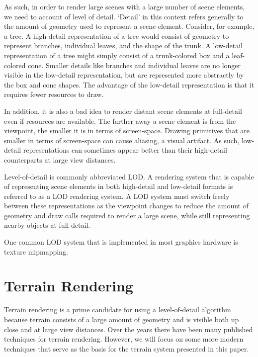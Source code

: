 As such, in order to render large scenes with a large number of scene elements, we need to account of level of detail.
`Detail' in this context refers generally to the amount of geometry used to represent a scene element.
Consider, for example, a tree.
A high-detail representation of a tree would consist of geometry to represent branches, individual leaves, and the shape of the trunk.
A low-detail representation of a tree might simply consist of a trunk-colored box and a leaf-colored cone.
Smaller details like branches and individual leaves are no longer visible in the low-detail representation, but are represented more abstractly by the box and cone shapes.
The advantage of the low-detail representation is that it requires fewer resources to draw.

In addition, it is also a bad idea to render distant scene elements at full-detail even if resources are available.
The farther away a scene element is from the viewpoint, the smaller it is in terms of screen-space.
Drawing primitives that are smaller in terms of screen-space can cause aliasing, a visual artifact.
As such, low-detail representations can sometimes appear better than their high-detail counterparts at large view distances.

Level-of-detail is commonly abbreviated LOD.
A rendering system that is capable of representing scene elements in both high-detail and low-detail formats is referred to as a LOD rendering system.
A LOD system must switch freely between these representations as the viewpoint changes to reduce the amount of geometry and draw calls required to render a large scene, while still representing nearby objects at full detail.

One common LOD system that is implemented in most graphics hardware is texture mipmapping. \cite{opengl_mipmaps}


\section{Terrain Rendering}

Terrain rendering is a prime candidate for using a level-of-detail algorithm because terrain consists of a large amount of geometry and is visible both up close and at large view distances.
Over the years there have been many published techniques for terrain rendering.
\cite{p-bdam}
\cite{hardware_lod}
\cite{diamondterrain}
\cite{roambetter}
\cite{clod}
\cite{roam}
\cite{righttri}
However, we will focus on some more modern techniques that serve as the basis for the terrain system presented in this paper.


